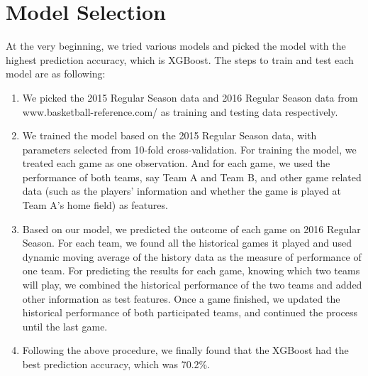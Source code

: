 \section{Model Selection}

At the very beginning, we tried various models and picked the model with 
the highest prediction accuracy, which is XGBoost. The steps to train and test
each model are as following:
\begin{enumerate}
    \item We picked the 2015 Regular Season data and 2016 Regular Season data
    from www.basketball-reference.com/ as training and testing data respectively.

    \item We trained the model based on the 2015 Regular Season data, with 
	    parameters selected from 10-fold cross-validation. For training the
	    model, we treated each game as one observation. And for each game,
	    we used the performance of both teams, say Team A and Team B, and
	    other game related data (such as the players’ information and whether
	    the game is played at Team A’s home field) as features.
	\item Based on our model, we predicted the outcome of each game on 
	    2016 Regular Season. For each team, we found all the historical games 
	    it played and used dynamic moving average of the history data as the measure
	    of performance of one team. For predicting the results for each game,
	    knowing which two teams will play, we combined the historical performance 
	    of the two teams and added other information as test features. Once a
	    game finished, we updated the historical performance of both
	    participated teams, and continued the process until the last game.
	\item Following the above procedure, we finally found that the XGBoost had 
	    the best prediction accuracy, which was 70.2\%.
\end{enumerate}



